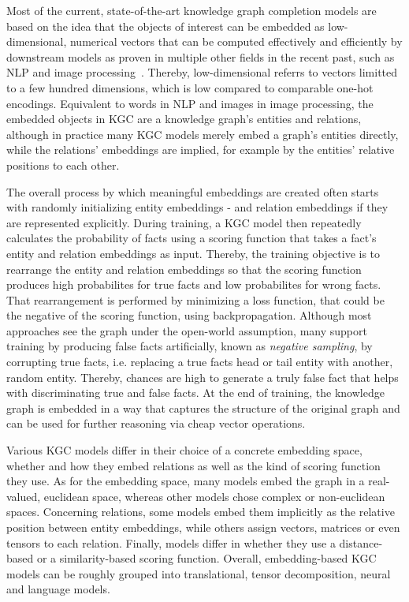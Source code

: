 Most of the current, state-of-the-art knowledge graph completion models are based on the idea that the objects of interest can be embedded as low-dimensional, numerical vectors that can be computed effectively and efficiently by downstream models as proven in multiple other fields in the recent past, such as NLP and image processing~\cite{Wang2017KnowledgeGE}. Thereby, low-dimensional referrs to vectors limitted to a few hundred dimensions, which is low compared to comparable one-hot encodings. Equivalent to words in NLP and images in image processing, the embedded objects in KGC are a knowledge graph's entities and relations, although in practice many KGC models merely embed a graph's entities directly, while the relations' embeddings are implied, for example by the entities' relative positions to each other.

The overall process by which meaningful embeddings are created often starts with randomly initializing entity embeddings - and relation embeddings if they are represented explicitly. During training, a KGC model then repeatedly calculates the probability of facts using a scoring function that takes a fact's entity and relation embeddings as input. Thereby, the training objective is to rearrange the entity and relation embeddings so that the scoring function produces high probabilites for true facts and low probabilites for wrong facts. That rearrangement is performed by minimizing a loss function, that could be the negative of the scoring function, using backpropagation. Although most approaches see the graph under the open-world assumption, many support training by producing false facts artificially, known as \emph{negative sampling}, by corrupting true facts, i.e. replacing a true facts head or tail entity with another, random entity. Thereby, chances are high to generate a truly false fact that helps with discriminating true and false facts. At the end of training, the knowledge graph is embedded in a way that captures the structure of the original graph and can be used for further reasoning via cheap vector operations.

Various KGC models differ in their choice of a concrete embedding space, whether and how they embed relations as well as the kind of scoring function they use. As for the embedding space, many models embed the graph in a real-valued, euclidean space, whereas other models chose complex or non-euclidean spaces. Concerning relations, some models embed them implicitly as the relative position between entity embeddings, while others assign vectors, matrices or even tensors to each relation. Finally, models differ in whether they use a distance-based or a similarity-based scoring function. Overall, embedding-based KGC models can be roughly grouped into translational, tensor decomposition, neural and language models.


